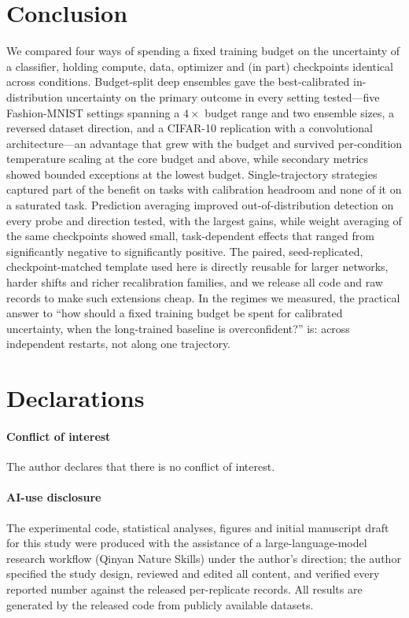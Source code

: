 \documentclass[11pt,a4paper]{article}
\begin{document}
\section{Conclusion}\label{sec:conclusion}

We compared four ways of spending a fixed training budget on the
uncertainty of a classifier, holding compute, data, optimizer and (in part)
checkpoints identical across conditions. Budget-split deep ensembles gave
the best-calibrated in-distribution uncertainty on the primary outcome in
every setting tested---five Fashion-MNIST settings spanning a $4\times$
budget range and two ensemble sizes, a reversed dataset direction, and a
CIFAR-10 replication with a convolutional architecture---an advantage that
grew with the budget and survived per-condition temperature scaling at the
core budget and above, while secondary metrics showed bounded exceptions at
the lowest budget. Single-trajectory strategies captured part of the
benefit on tasks with calibration headroom and none of it on a saturated
task. Prediction averaging improved out-of-distribution detection on
every probe and direction tested, with the largest gains, while weight
averaging of the same checkpoints showed small, task-dependent effects
that ranged from significantly negative to significantly positive. The
paired, seed-replicated, checkpoint-matched template used
here is directly reusable for larger networks, harder shifts and richer
recalibration families, and we release all code and raw records to make
such extensions cheap. In the regimes we measured, the practical answer to
``how should a fixed training budget be spent for calibrated uncertainty,
when the long-trained baseline is overconfident?'' is: across independent
restarts, not along one trajectory.

\section*{Declarations}

\paragraph{Conflict of interest}
The author declares that there is no conflict of interest.

\paragraph{AI-use disclosure}
The experimental code, statistical analyses, figures and initial manuscript
draft for this study were produced with the assistance of a large-language-model
research workflow (Qinyan Nature Skills) under the author's direction; the
author specified the study design, reviewed and edited all content, and
verified every reported number against the released per-replicate records.
All results are generated by the released code from publicly available
datasets.
\end{document}
